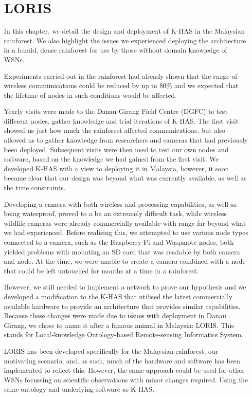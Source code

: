 \chapter{LORIS}
	In this chapter, we detail the design and deployment of K-HAS in the Malaysian rainforest. We also highlight the issues we experienced deploying the architecture in a humid, dense rainforest for use by those without domain knowledge of WSNs.
	
	Experiments carried out in the rainforest had already shown that the range of wireless communications could be reduced by up to 80\% and we expected that the lifetime of nodes in such conditions would be affected.
	
	Yearly visits were made to the Danau Girang Field Centre (DGFC) to test different nodes, gather knowledge and trial iterations of K-HAS. The first visit showed us just how much the rainforest affected communications, but also allowed us to gather knowledge from researchers and cameras that had previously been deployed. Subsequent visits were then used to test our own nodes and software, based on the knowledge we had gained from the first visit. We developed K-HAS with a view to deploying it in Malaysia, however, it soon became clear that our design was  beyond what was currently available, as well as the time constraints.
	
	Developing a camera with both wireless and processing capabilities, as well as being waterproof, proved to a be an extremely difficult task, while wireless wildlife cameras were already commercially available with range far beyond what we had experienced. Before realising this, we attempted to use various node types connected to a camera, such as the Raspberry Pi and Waspmote nodes, both yielded problems with mounting an SD card that was readable by both camera and node. At the time, we were unable to create a camera combined with a node that could be left untouched for months at a time in a rainforest.
	
	However, we still needed to implement a network to prove our hypothesis and we developed a modification to the K-HAS that utilised the latest commercially available hardware to provide an architecture that provides similar capabilities. Because these changes were made due to issues with deployment in Danau Girang, we chose to name it after a famous animal in Malaysia: LORIS. This stands for Local-knowledge Ontology-based Remote-sensing Informatics System.
	
	LORIS has been developed specifically for the Malaysian rainforest, our motivating scenario, and, as such, much of the hardware and software has been implemented to reflect this. However, the same approach could be used for other WSNs focussing on scientific observations with minor changes required. Using the same ontology and underlying software as K-HAS.
	
